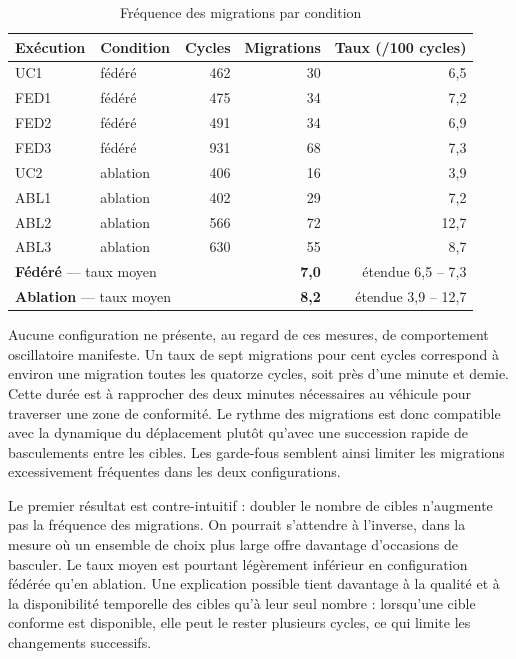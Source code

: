 \begin{table}[H]
    \centering
    \caption{Fréquence des migrations par condition}
    \label{tab:frequence-migrations}
    \begin{tabular}{llrrr}
        \toprule
        \textbf{Exécution} & \textbf{Condition} & \textbf{Cycles} & \textbf{Migrations} & \textbf{Taux (/100 cycles)} \\
        \midrule
        UC1  & fédéré   & 462 & 30 & 6,5 \\
        FED1 & fédéré   & 475 & 34 & 7,2 \\
        FED2 & fédéré   & 491 & 34 & 6,9 \\
        FED3 & fédéré   & 931 & 68 & 7,3 \\
        \addlinespace
        UC2  & ablation & 406 & 16 & 3,9 \\
        ABL1 & ablation & 402 & 29 & 7,2 \\
        ABL2 & ablation & 566 & 72 & 12,7 \\
        ABL3 & ablation & 630 & 55 & 8,7 \\
        \midrule
        \multicolumn{2}{l}{\textbf{Fédéré} — taux moyen}   & \multicolumn{2}{r}{\textbf{7,0}} & étendue 6,5 -- 7,3 \\
        \multicolumn{2}{l}{\textbf{Ablation} — taux moyen} & \multicolumn{2}{r}{\textbf{8,2}} & étendue 3,9 -- 12,7 \\
        \bottomrule
    \end{tabular}
\end{table}

Aucune configuration ne présente, au regard de ces mesures, de comportement oscillatoire manifeste. Un taux de sept migrations pour cent cycles correspond à environ une migration toutes les quatorze cycles, soit près d'une minute et demie. Cette durée est à rapprocher des deux minutes nécessaires au véhicule pour traverser une zone de conformité. Le rythme des migrations est donc compatible avec la dynamique du déplacement plutôt qu'avec une succession rapide de basculements entre les cibles. Les garde-fous semblent ainsi limiter les migrations excessivement fréquentes dans les deux configurations.

Le premier résultat est contre-intuitif : doubler le nombre de cibles n'augmente pas la fréquence des migrations. On pourrait s'attendre à l'inverse, dans la mesure où un ensemble de choix plus large offre davantage d'occasions de basculer. Le taux moyen est pourtant légèrement inférieur en configuration fédérée qu'en ablation. Une explication possible tient davantage à la qualité et à la disponibilité temporelle des cibles qu'à leur seul nombre : lorsqu'une cible conforme est disponible, elle peut le rester plusieurs cycles, ce qui limite les changements successifs.

